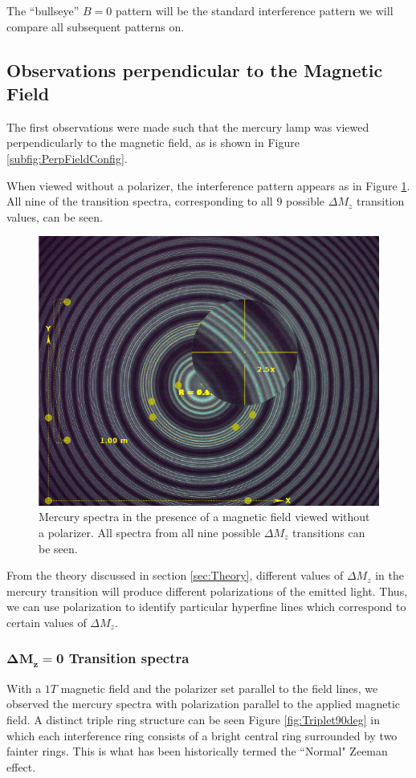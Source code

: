 \documentclass[twocolumn]{article}
\begin{document}
	 The ``bullseye'' $B=0$ pattern will be the standard interference pattern we will compare all subsequent patterns on.
	 
	\subsection{Observations perpendicular to the Magnetic Field}
		The first observations were made such that the mercury lamp was viewed perpendicularly to the magnetic field, as is shown in Figure \ref{subfig:PerpFieldConfig}.
		
		When viewed without a polarizer, the interference pattern appears as in Figure \ref{fig:Run2_NoPolarizer_detail}.
		All nine of the transition spectra, corresponding to all 9 possible $\Delta M_z$ transition values, can be seen.
		
		\begin{figure}
			\centering
			\includegraphics[width=0.6\linewidth]{Images/Run2_NoPolarizer_detail}
			\caption{Mercury spectra in the presence of a magnetic field viewed without a polarizer. All spectra from all nine possible $\Delta M_z$ transitions can be seen.}
			\label{fig:Run2_NoPolarizer_detail}
		\end{figure}

		From the theory discussed in section \ref{sec:Theory}, different values of $\Delta M_z$ in the mercury transition will produce different polarizations of the emitted light.
		Thus, we can use polarization to identify particular hyperfine lines which correspond to certain values of $\Delta M_z$.
		
		\subsubsection{$\mathbf{\Delta M_z = 0}$ Transition spectra}
			With a $1T$ magnetic field and the polarizer set parallel to the field lines, we observed the mercury spectra with polarization parallel to the applied magnetic field. A distinct triple ring structure can be seen Figure \ref{fig:Triplet90deg} in which each interference ring consists of a bright central ring surrounded by two fainter rings. 
			This is what has been historically termed the ``Normal" Zeeman effect.
			
\end{document}
